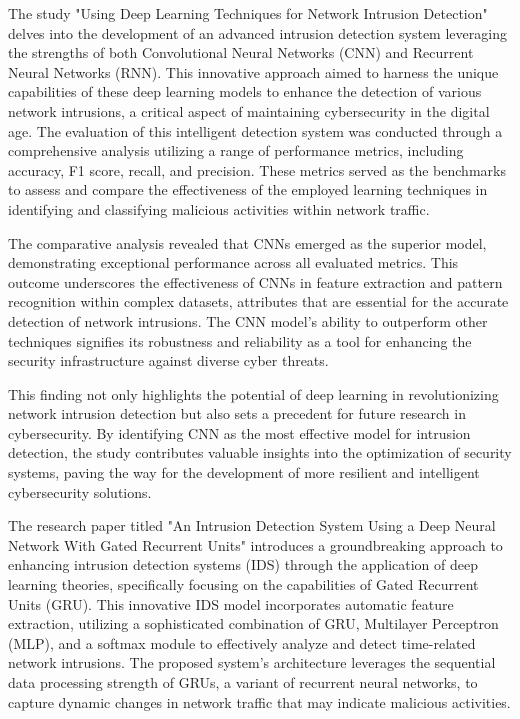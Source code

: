 \par 
The study "Using Deep Learning Techniques for Network Intrusion Detection" delves into the development of an advanced intrusion detection system leveraging the strengths of both Convolutional Neural Networks (CNN) and Recurrent Neural Networks (RNN). This innovative approach aimed to harness the unique capabilities of these deep learning models to enhance the detection of various network intrusions, a critical aspect of maintaining cybersecurity in the digital age. The evaluation of this intelligent detection system was conducted through a comprehensive analysis utilizing a range of performance metrics, including accuracy, F1 score, recall, and precision. These metrics served as the benchmarks to assess and compare the effectiveness of the employed learning techniques in identifying and classifying malicious activities within network traffic.\par
The comparative analysis revealed that CNNs emerged as the superior model, demonstrating exceptional performance across all evaluated metrics. This outcome underscores the effectiveness of CNNs in feature extraction and pattern recognition within complex datasets, attributes that are essential for the accurate detection of network intrusions. The CNN model's ability to outperform other techniques signifies its robustness and reliability as a tool for enhancing the security infrastructure against diverse cyber threats.\par 
This finding not only highlights the potential of deep learning in revolutionizing network intrusion detection but also sets a precedent for future research in cybersecurity. By identifying CNN as the most effective model for intrusion detection, the study contributes valuable insights into the optimization of security systems, paving the way for the development of more resilient and intelligent cybersecurity solutions\cite{al2020using}.
\par 
The research paper titled "An Intrusion Detection System Using a Deep Neural Network With Gated Recurrent Units" introduces a groundbreaking approach to enhancing intrusion detection systems (IDS) through the application of deep learning theories, specifically focusing on the capabilities of Gated Recurrent Units (GRU). This innovative IDS model incorporates automatic feature extraction, utilizing a sophisticated combination of GRU, Multilayer Perceptron (MLP), and a softmax module to effectively analyze and detect time-related network intrusions. The proposed system's architecture leverages the sequential data processing strength of GRUs, a variant of recurrent neural networks, to capture dynamic changes in network traffic that may indicate malicious activities.\par 
